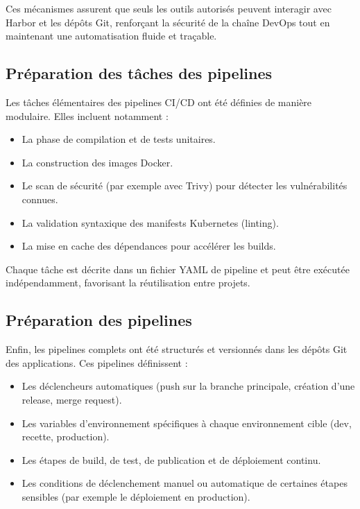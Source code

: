 \vspace{0.5cm}
Ces mécanismes assurent que seuls les outils autorisés peuvent interagir avec Harbor et les dépôts Git, renforçant la sécurité de la chaîne DevOps tout en maintenant une automatisation fluide et traçable.

\subsection{Préparation des tâches des pipelines}

Les tâches élémentaires des pipelines CI/CD ont été définies de manière modulaire.
Elles incluent notamment :
\begin{itemize}
	\item La phase de compilation et de tests unitaires.
	\item La construction des images Docker.
	\item Le scan de sécurité (par exemple avec Trivy) pour détecter les vulnérabilités connues.
	\item La validation syntaxique des manifests Kubernetes (linting).
	\item La mise en cache des dépendances pour accélérer les builds.
\end{itemize}

Chaque tâche est décrite dans un fichier YAML de pipeline et peut être exécutée indépendamment, favorisant la réutilisation entre projets.

\subsection{Préparation des pipelines}

Enfin, les pipelines complets ont été structurés et versionnés dans les dépôts Git des applications.
Ces pipelines définissent :
\begin{itemize}
	\item Les déclencheurs automatiques (push sur la branche principale, création d’une release, merge request).
	\item Les variables d’environnement spécifiques à chaque environnement cible (dev, recette, production).
	\item Les étapes de build, de test, de publication et de déploiement continu.
	\item Les conditions de déclenchement manuel ou automatique de certaines étapes sensibles (par exemple le déploiement en production).
\end{itemize}


